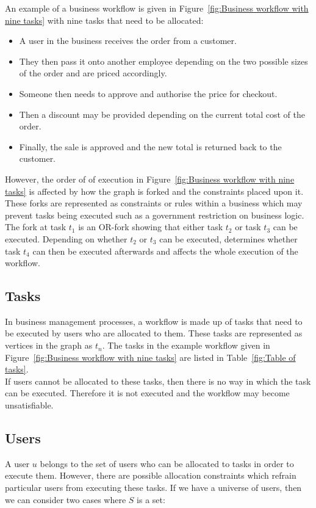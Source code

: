 \documentclass[a4paper]{report}
\begin{document}
An example of a business workflow is given in Figure~\ref{fig:Business workflow with nine tasks} with nine tasks that need to be allocated:
\begin{itemize}
\item A user in the business receives the order from a customer.
\item They then pass it onto another employee depending on the two possible sizes of the order and are priced accordingly. 
\item Someone then needs to approve and authorise the price for checkout.
\item Then a discount may be provided depending on the current total cost of the order.
\item Finally, the sale is approved and the new total is returned back to the customer.
\end{itemize}

However, the order of of execution in Figure~\ref{fig:Business workflow with nine tasks} is affected by how the graph is forked and the constraints placed upon it. These forks are represented as constraints or rules within a business which may prevent tasks being executed such as a government restriction on business logic. The fork at task $t_{1}$ is an OR-fork showing that either task $t_{2}$ or task $t_{3}$ can be executed. Depending on whether $t_{2}$ or $t_{3}$ can be executed, determines whether task $t_{4}$ can then be executed afterwards and affects the whole execution of the workflow.  \\

\subsection{Tasks}
In business management processes, a workflow is made up of tasks that need to be executed by users who are allocated to them. These tasks are represented as vertices in the graph as $t_{n}$. The tasks in the example workflow given in Figure~\ref{fig:Business workflow with nine tasks} are listed in Table~\ref{fig:Table of tasks}.\\

If users cannot be allocated to these tasks, then there is no way in which the task can be executed. Therefore it is not executed and the workflow may become unsatisfiable.\\

\subsection{Users}
A user $u$ belongs to the set of users who can be allocated to tasks in order to execute them. However, there are possible allocation constraints which refrain particular users from executing these tasks. If we have a universe of users, then we can consider two cases where $S$ is a set:
\end{document}

